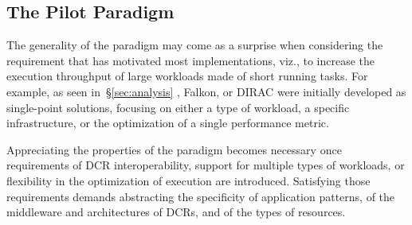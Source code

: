 \documentclass{sig-alternate}
\begin{document}

\subsection{The Pilot Paradigm}
\label{sec:paradigm}



The generality of the \pilot paradigm may come as a surprise when considering
the requirement that has motivated most implementations, viz., to increase the
execution throughput of large workloads made of short running tasks. For
example, as seen in~\S\ref{sec:analysis} \panda, Falkon, or DIRAC were initially
developed as single-point solutions, focusing on either a type of workload, a
specific infrastructure, or the optimization of a single performance metric.

Appreciating the properties of the \pilot paradigm becomes necessary once
requirements of DCR interoperability, support for multiple types of workloads,
or flexibility in the optimization of execution are introduced. Satisfying those
requirements demands abstracting the specificity of application patterns, of the
middleware and architectures of DCRs, and of the types of resources.

\end{document}
